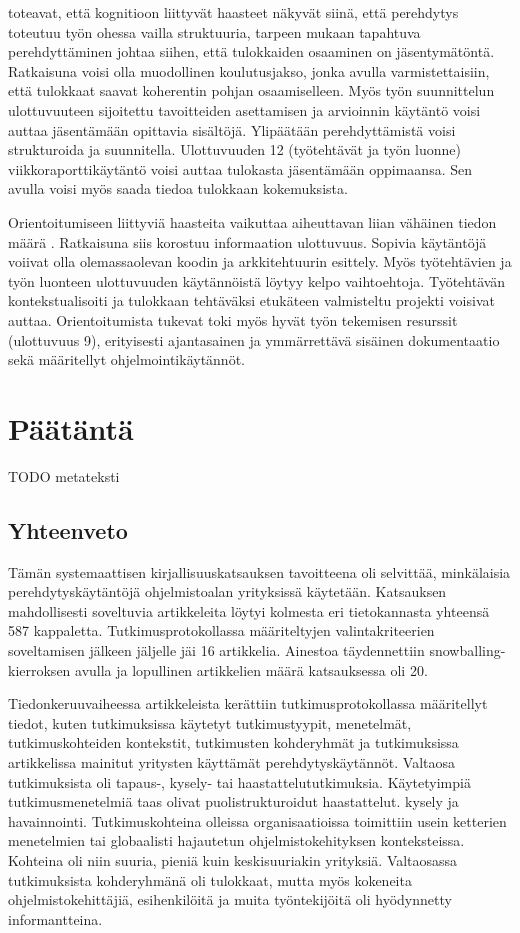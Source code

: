 \documentclass[utf8]{gradu3}
\begin{document}
\textcite{begel-simon-2008} toteavat, että kognitioon liittyvät haasteet näkyvät siinä, että perehdytys toteutuu työn ohessa vailla struktuuria, tarpeen mukaan tapahtuva perehdyttäminen johtaa siihen, että tulokkaiden osaaminen on jäsentymätöntä. Ratkaisuna voisi olla muodollinen koulutusjakso, jonka avulla varmistettaisiin, että tulokkaat saavat koherentin pohjan osaamiselleen. Myös työn suunnittelun ulottuvuuteen sijoitettu tavoitteiden asettamisen ja arvioinnin käytäntö voisi auttaa jäsentämään opittavia sisältöjä. Ylipäätään perehdyttämistä voisi strukturoida ja suunnitella. Ulottuvuuden 12 (työtehtävät ja työn luonne) viikkoraporttikäytäntö voisi auttaa tulokasta jäsentämään oppimaansa. Sen avulla voisi myös saada tiedoa tulokkaan kokemuksista.

Orientoitumiseen liittyviä haasteita vaikuttaa aiheuttavan liian vähäinen tiedon määrä \parencite{begel-simon-2008}. Ratkaisuna siis korostuu informaation ulottuvuus. Sopivia käytäntöjä voiivat olla olemassaolevan koodin ja arkkitehtuurin esittely. Myös työtehtävien ja työn luonteen ulottuvuuden käytännöistä löytyy kelpo vaihtoehtoja. Työtehtävän kontekstualisoiti ja tulokkaan tehtäväksi etukäteen valmisteltu projekti voisivat auttaa. Orientoitumista tukevat toki myös hyvät työn tekemisen resurssit (ulottuvuus 9), erityisesti ajantasainen ja ymmärrettävä sisäinen dokumentaatio sekä määritellyt ohjelmointikäytännöt.

\chapter{Päätäntä}

TODO metateksti

\section{Yhteenveto}

Tämän systemaattisen kirjallisuuskatsauksen tavoitteena oli selvittää, minkälaisia perehdytyskäytäntöjä ohjelmistoalan yrityksissä käytetään. Katsauksen mahdollisesti soveltuvia artikkeleita löytyi kolmesta eri tietokannasta yhteensä 587 kappaletta. Tutkimusprotokollassa määriteltyjen valintakriteerien soveltamisen jälkeen jäljelle jäi 16 artikkelia. Ainestoa täydennettiin snowballing-kierroksen avulla ja lopullinen artikkelien määrä katsauksessa oli 20.

Tiedonkeruuvaiheessa artikkeleista kerättiin tutkimusprotokollassa määritellyt tiedot, kuten tutkimuksissa käytetyt tutkimustyypit, menetelmät, tutkimuskohteiden kontekstit, tutkimusten kohderyhmät ja tutkimuksissa artikkelissa mainitut yritysten käyttämät perehdytyskäytännöt. Valtaosa tutkimuksista oli tapaus-, kysely- tai haastattelututkimuksia. Käytetyimpiä tutkimusmenetelmiä taas olivat puolistrukturoidut haastattelut. kysely ja havainnointi. Tutkimuskohteina olleissa organisaatioissa toimittiin usein ketterien menetelmien tai globaalisti hajautetun ohjelmistokehityksen  konteksteissa. Kohteina oli niin suuria, pieniä kuin keskisuuriakin yrityksiä. Valtaosassa tutkimuksista kohderyhmänä oli tulokkaat, mutta myös kokeneita ohjelmistokehittäjiä, esihenkilöitä ja muita työntekijöitä oli hyödynnetty informantteina. 
\end{document}
